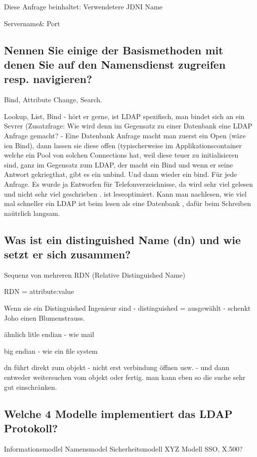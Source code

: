 Diese Anfrage beinhaltet:
Verwendetere JDNI Name 

Servername\& Port

\subsection{Nennen Sie einige der Basismethoden mit denen Sie auf den Namensdienst zugreifen resp. navigieren?}

Bind, Attribute Change, Search.

Lookup, List, Bind - hört er gerne, ist LDAP spezifisch, man bindet sich an ein Sevrer (Zusatzfrage: Wie wird denn im Gegensatz zu einer Datenbank eine LDAP Anfrage gemacht? - Eine Datenbank Anfrage macht man zuerst ein Open (wäre ien Bind), dann lassen sie diese offen (typischerweise im Applikationscontainer welche ein Pool von solchen Connections hat, weil diese teuer zu initialisieren sind, ganz im Gegensatz zum LDAP, der macht ein Bind und wenn er seine Antwort gekriegthat, gibt es ein unbind. Und dann wieder ein bind. Für jede Anfrage. Es wurde ja Entworfen für Telefonverzeichnisse, da wird sehr viel gelesen und nicht sehr viel geschrieben . ist leseoptimiert. Kann man nachlesen, wie viel mal schneller ein LDAP ist beim lesen als eine Datenbank , dafür beim Schreiben naütrlich langsam.

\subsection{Was ist ein distinguished Name (dn) und wie setzt er sich zusammen?}
Sequenz von mehreren RDN (Relative Distinguished Name)

RDN = attribute:value


Wenn sie ein Distinguished Ingenieur sind - distinguished = ausgewählt - schenkt Joho einen Blumenstrauss. 

ähnlich litle endian - wie mail

big endian - wie ein file system

dn führt direkt zum objekt - nicht erst verbindung öffnen usw. - und dann entweder weitersuchen vom objekt oder fertig. man kann eben so die suche sehr gut einschränken.

\subsection{Welche 4 Modelle implementiert das LDAP Protokoll?}
Informationsmodlel
Namensmodel
Sicherheitsmodell
XYZ Modell
SSO, X.500?

